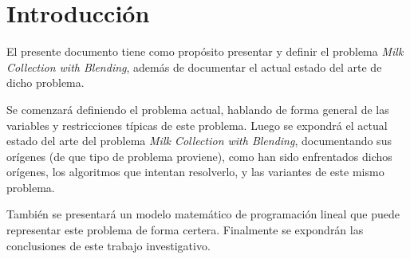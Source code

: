 \section{Introducción}

El presente documento tiene como propósito presentar y definir el problema \textit{Milk Collection with Blending}, además de documentar el actual estado del arte de dicho problema.

Se comenzará definiendo el problema actual, hablando de forma general de las variables y restricciones típicas de este problema. Luego se expondrá el actual estado del arte del problema \textit{Milk Collection with Blending}, documentando sus orígenes (de que tipo de problema proviene), como han sido enfrentados dichos orígenes, los algoritmos que intentan resolverlo, y las variantes de este mismo problema. 

También se presentará un modelo matemático de programación lineal que puede representar este problema de forma certera. Finalmente se expondrán las conclusiones de este trabajo investigativo.
